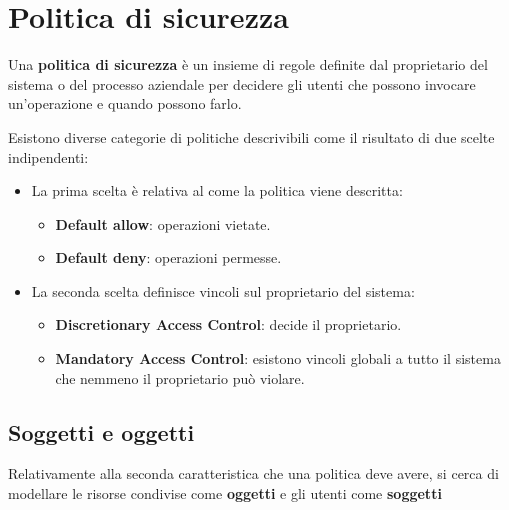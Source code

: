 \section{Politica di sicurezza}
Una \textbf{politica di sicurezza} è un insieme di regole definite dal proprietario del sistema o del processo
aziendale per decidere gli utenti che possono invocare un'operazione e quando possono farlo.

Esistono diverse categorie di politiche descrivibili come il risultato di due scelte indipendenti:
\begin{itemize}
	\item La prima scelta è relativa al come la politica viene descritta:
	      \begin{itemize}
		      \item \textbf{Default allow}: operazioni vietate.
		      \item \textbf{Default deny}: operazioni permesse.
	      \end{itemize}
	\item La seconda scelta definisce vincoli sul proprietario del sistema:
	      \begin{itemize}
		      \item \textbf{Discretionary Access Control}: decide il proprietario.
		      \item \textbf{Mandatory Access Control}: esistono vincoli globali a tutto il sistema che nemmeno il
		            proprietario può violare.
	      \end{itemize}
\end{itemize}

\subsection{Soggetti e oggetti}
Relativamente alla seconda caratteristica che una politica deve avere, si cerca di modellare le risorse condivise
come \textbf{oggetti} e gli utenti come \textbf{soggetti}